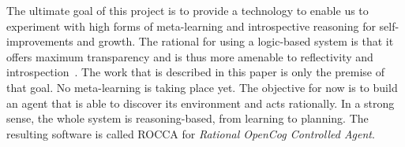 \documentclass[runningheads]{llncs}
\begin{document}
The ultimate goal of this project is to provide a technology to enable
us to experiment with high forms of meta-learning and introspective
reasoning for self-improvements and growth.  The rational for using a
logic-based system is that it offers maximum transparency and is thus
more amenable to reflectivity and introspection~\cite{Schmidhuber2003,
  Goertzel2014EGI1}.  The work that is described in this paper is only
the premise of that goal.  No meta-learning is taking place yet.  The
objective for now is to build an agent that is able to discover its
environment and acts rationally.  In a strong sense, the whole system
is reasoning-based, from learning to planning.  The resulting software
is called ROCCA for \emph{Rational OpenCog Controlled Agent}.








\end{document}
